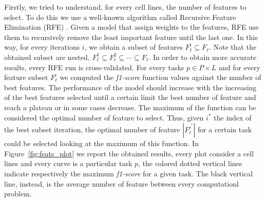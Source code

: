 Firstly, we tried to understand, for every cell lines, the number of features to select. To do this we use a well-known algorithm called Recursive Feature Elimination (RFE) \cite{VapnikRFE}. Given a model that assign weights to the features, RFE use them to recursively remove the least important feature until the last one. In this way, for every iterations $i$, we obtain a subset of features $F_{\ell}^{i} \subseteq F_\ell$. Note that the obtained subset are nested, $F_{\ell}^{1}  \subseteq  F_{\ell}^{2} \subseteq \cdots \subseteq F_{\ell}$. In order to obtain more accurate results, every RFE run is cross-validated. For every tasks $p \in P \times L$ and for every feature subset $F_\ell^i$ we computed the \emph{f1-score} function values against the number of best features. The performance of the model should increase with the increasing of the best features selected until a certain limit the best number of feature and reach a plateau or in some cases decrease. The maximum of the function can be considered the optimal number of feature to select. Thus, given $i^{*}$ the index of the best subset iteration, the optimal number of feature $|F_\ell^{i^{*}}|$ for a certain task could be selected looking at the maximum of this function. In Figure~\ref{fig:feats_plot} we report the obtained results, every plot consider a cell lines and every curve is a particular task $p$, the colored dotted vertical lines indicate respectively the maximum \emph{f1-score} for a given task. The black vertical line, instead, is the average number of feature between every computationl problem. 


